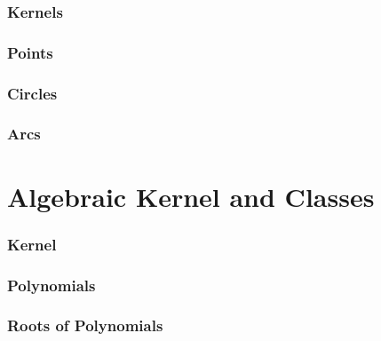 	\subsubsection*{Kernels}

	\subsubsection*{Points}

	\subsubsection*{Circles}

	\subsubsection*{Arcs}

\section{Algebraic Kernel and Classes}

	\subsubsection*{Kernel}

	\subsubsection*{Polynomials} 

	\subsubsection*{Roots of Polynomials}
